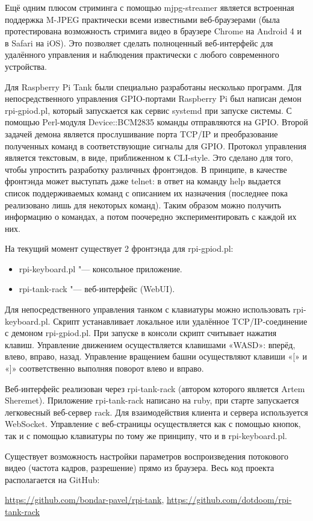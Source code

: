 \documentclass[10pt, a5paper]{article}
\begin{document}
Ещё одним плюсом стриминга с помощью mjpg-streamer является встроенная поддержка M-JPEG практически всеми известными веб-браузерами (была протестирована  возможность стримига видео в браузере Chrome на Android 4 и в Safari на iOS). Это позволяет сделать полноценный веб-интерфейс для удалённого управления и наблюдения практически с любого современного устройства.

Для Raspberry Pi Tank были специально разработаны несколько программ.
Для непосредственного управления GPIO-портами Raspberry Pi был написан демон  rpi-gpiod.pl, который запускается как сервис systemd при запуске системы. С помощью Perl-модуля Device::BCM2835 команды отправляются на GPIO. Второй задачей демона является прослушивание порта TCP/IP  и преобразование полученных команд в соответствующие сигналы для GPIO. Протокол управления является текстовым, в виде, приближенном к CLI-style. Это сделано для того, чтобы упростить разработку различных фронтэндов. В принципе, в качестве фронтэнда может выступать даже telnet: в ответ на команду help выдается список поддерживаемых команд с описанием их назначения (последнее пока реализовано лишь для некоторых команд). Таким образом можно получить информацию о командах, а потом поочередно экспериментировать с каждой их них.

На текущий момент существует 2 фронтэнда для rpi-gpiod.pl:

\begin{itemize}
  \item rpi-keyboard.pl "--- консольное приложение.
  \item rpi-tank-rack "--- веб-интерфейс (WebUI).
\end{itemize}

Для непосредственного управления танком с клавиатуры можно использовать rpi-keyboard.pl. Скрипт устанавливает локальное или удалённое TCP/IP-соединение с демоном rpi-gpiod.pl.  При запуске в консоли скрипт считывает нажатия клавиш. Управление движением осуществляется клавишами «WASD»: вперёд, влево, вправо, назад. Управление вращением башни осуществляют клавиши «[» и «]» соответственно выполняя поворот влево и вправо.

Веб-интерфейс реализован через rpi-tank-rack (автором которого является Artem Sheremet). Приложение rpi-tank-rack написано на ruby, при старте запускается легковесный веб-сервер rack. Для взаимодействия клиента и сервера используется WebSocket. Управление с  веб-страницы осуществляется как с помощью кнопок, так и с помощью клавиатуры по тому же принципу, что и в rpi-keyboard.pl.

Существует возможность настройки параметров воспроизведения потокового видео (частота кадров, разрешение) прямо из браузера.
Весь код проекта располагается на GitHub:

\url{https://github.com/bondar-pavel/rpi-tank}, \url{https://github.com/dotdoom/rpi-tank-rack}
\end{document}

